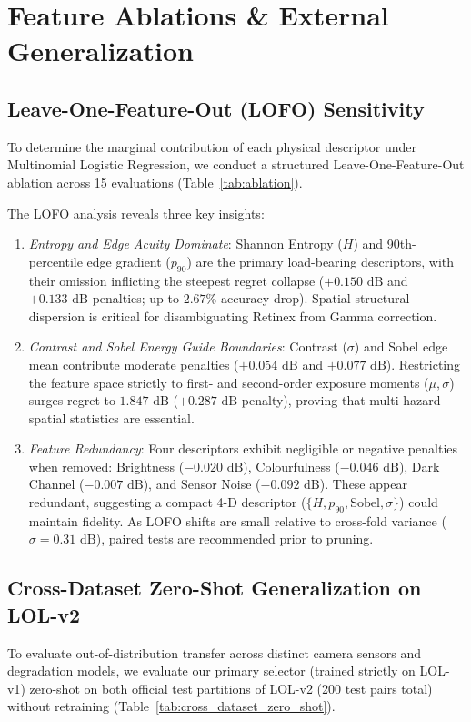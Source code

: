 \documentclass[journal]{IEEEtran}
\begin{document}
\section{Feature Ablations \& External Generalization}

\subsection{Leave-One-Feature-Out (LOFO) Sensitivity}
To determine the marginal contribution of each physical descriptor under Multinomial Logistic Regression, we conduct a structured Leave-One-Feature-Out ablation across 15 evaluations (Table~\ref{tab:ablation}).



The LOFO analysis reveals three key insights:
\begin{enumerate}
    \setlength{\itemsep}{1pt}
    \setlength{\parskip}{0pt}
    \item \textit{Entropy and Edge Acuity Dominate}: Shannon Entropy ($H$) and 90th-percentile edge gradient ($p_{90}$) are the primary load-bearing descriptors, with their omission inflicting the steepest regret collapse ($+0.150\text{ dB}$ and $+0.133\text{ dB}$ penalties; up to $2.67\%$ accuracy drop). Spatial structural dispersion is critical for disambiguating Retinex from Gamma correction.
    \item \textit{Contrast and Sobel Energy Guide Boundaries}: Contrast ($\sigma$) and Sobel edge mean contribute moderate penalties ($+0.054\text{ dB}$ and $+0.077\text{ dB}$). Restricting the feature space strictly to first- and second-order exposure moments ($\mu, \sigma$) surges regret to $1.847\text{ dB}$ ($+0.287\text{ dB}$ penalty), proving that multi-hazard spatial statistics are essential.
    \item \textit{Feature Redundancy}: Four descriptors exhibit negligible or negative penalties when removed: Brightness ($-0.020\text{ dB}$), Colourfulness ($-0.046\text{ dB}$), Dark Channel ($-0.007\text{ dB}$), and Sensor Noise ($-0.092\text{ dB}$). These appear redundant, suggesting a compact 4-D descriptor ($\{H, p_{90}, \text{Sobel}, \sigma\}$) could maintain fidelity. As LOFO shifts are small relative to cross-fold variance ($\sigma = 0.31\text{ dB}$), paired tests are recommended prior to pruning.
\end{enumerate}

\enlargethispage{3\baselineskip}
\subsection{Cross-Dataset Zero-Shot Generalization on LOL-v2}
To evaluate out-of-distribution transfer across distinct camera sensors and degradation models, we evaluate our primary selector (trained strictly on LOL-v1) zero-shot on both official test partitions of LOL-v2 \cite{yang2021sparse} (200 test pairs total) without retraining (Table~\ref{tab:cross_dataset_zero_shot}).
\end{document}
